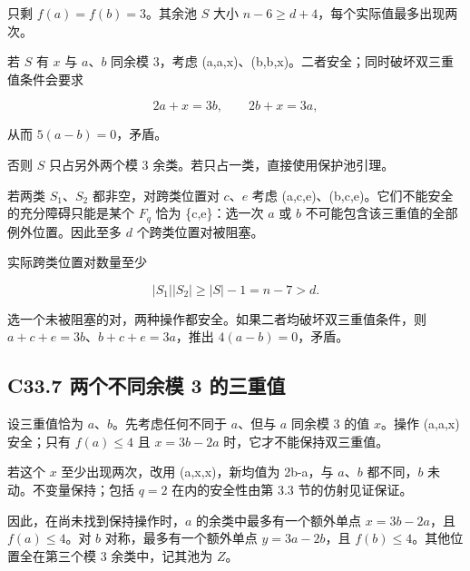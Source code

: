 \documentclass[11pt,a4paper]{article}
\theoremstyle{definition}
\numberwithin{equation}{section}
\begin{document}
{只剩} {\ensuremath{f(a)=f(b)=3}。其余池} {\ensuremath{S}} {大小} {\ensuremath{n-6\ge d+4}，每个实际值最多出现两次。}

{若} {\ensuremath{S}} {有} {\ensuremath{x}} {与} {\ensuremath{a}、\ensuremath{b}} {同余模} {3，考虑} {(a,a,x)、(b,b,x)。二者安全；同时破坏双三重值条件会要求}

\[
2a+x=3b,\qquad 2b+x=3a,
\]

{从而} {\ensuremath{5(a-b)=0}，矛盾。}

{否则} {\ensuremath{S}} {只占另外两个模} {3} {余类。若只占一类，直接使用保护池引理。}

{若两类} {\ensuremath{S_{1}}、\ensuremath{S_{2}}} {都非空，对跨类位置对} {\ensuremath{c}、\ensuremath{e}} {考虑} {(a,c,e)、(b,c,e)。它们不能安全的充分障碍只能是某个} {\ensuremath{F_{q}}} {恰为} {\{c,e\}：选一次} {\ensuremath{a}} {或} {\ensuremath{b}} {不可能包含该三重值的全部例外位置。因此至多} {\ensuremath{d}} {个跨类位置对被阻塞。}

{实际跨类位置对数量至少}

\[
|S_1||S_2|\ge |S|-1=n-7>d.
\]

{选一个未被阻塞的对，两种操作都安全。如果二者均破坏双三重值条件，则} {\ensuremath{a+c+e=3b}、\ensuremath{b+c+e=3a}，推出} {\ensuremath{4(a-b)=0}，矛盾。}

\subsection*{\texorpdfstring{{C33.7} {两个不同余模} {3} {的三重值}}{C33.7 两个不同余模 3 的三重值}}\label{C33-h221}

{设三重值恰为} {\ensuremath{a}、\ensuremath{b}。先考虑任何不同于} {\ensuremath{a}、但与} {\ensuremath{a}} {同余模} {3} {的值} {\ensuremath{x}。操作} {(a,a,x)} {安全；只有} {\ensuremath{f(a)\le 4}} {且} {\ensuremath{x=3b-2a}} {时，它才不能保持双三重值。}

{若这个} {\ensuremath{x}} {至少出现两次，改用} {(a,x,x)，新均值为} {2b-a，与} {\ensuremath{a}、\ensuremath{b}} {都不同，\ensuremath{b}} {未动。不变量保持；包括} {\ensuremath{q=2}} {在内的安全性由第} {3.3} {节的仿射见证保证。}

{因此，在尚未找到保持操作时，\ensuremath{a}} {的余类中最多有一个额外单点} {\ensuremath{x=3b-2a}，且} {\ensuremath{f(a)\le 4}。对} {\ensuremath{b}} {对称，最多有一个额外单点} {\ensuremath{y=3a-2b}，且} {\ensuremath{f(b)\le 4}。其他位置全在第三个模} {3} {余类中，记其池为} {\ensuremath{Z}。}
\end{document}
